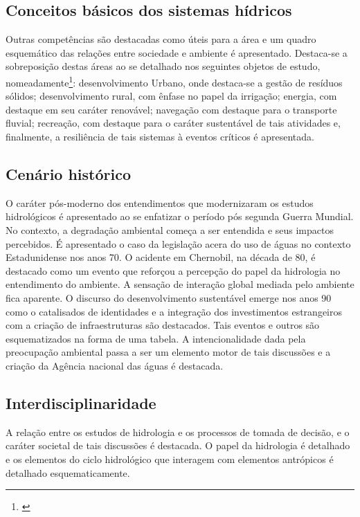 \documentclass[
   article,       %
   12pt,          %
   oneside,       %
   a4paper,       %
   english,       %
   brazil,           %
   sumario=tradicional
   ]{abntex2}
\begin{document}
\subsection{Conceitos básicos dos sistemas hídricos}


Outras competências são destacadas como úteis para a área e um quadro esquemático das relações entre sociedade e ambiente é apresentado. Destaca-se a sobreposição destas áreas ao se detalhado nos seguintes objetos de estudo, nomeadamente\footnote{\cite[p.255-257]{Interdisciplinaridade_Hidricos}}: desenvolvimento Urbano, onde destaca-se a gestão de resíduos sólidos; desenvolvimento rural, com ênfase no papel da irrigação; energia, com destaque em seu caráter renovável; navegação com destaque para o transporte fluvial; recreação, com destaque para o caráter sustentável de tais atividades e, finalmente, a resiliência de tais sistemas à eventos críticos é apresentada.


\subsection{Cenário histórico}

O caráter pós-moderno dos entendimentos que modernizaram os estudos hidrológicos é apresentado ao se enfatizar o período pós segunda Guerra Mundial. No contexto, a degradação ambiental começa a ser entendida e seus impactos percebidos. É apresentado o caso da legislação acera do uso de águas no contexto Estadunidense nos anos 70. O acidente em Chernobil, na década de 80, é destacado como um evento que reforçou a percepção do papel da hidrologia no entendimento do ambiente. A sensação de interação global mediada pelo ambiente fica aparente. O discurso do desenvolvimento sustentável emerge nos anos 90 como o catalisados de identidades e a integração dos investimentos estrangeiros com a criação de infraestruturas são destacados. Tais eventos e outros são esquematizados na forma de uma tabela. A intencionalidade dada pela preocupação ambiental passa a ser um elemento motor de tais discussões e a criação da Agência nacional das águas é destacada.


\subsection{Interdisciplinaridade}

A relação entre os estudos de hidrologia e os processos de tomada de decisão, e o caráter societal de tais discussões é destacada. O papel da hidrologia é detalhado e os elementos do ciclo hidrológico que interagem com elementos antrópicos é detalhado esquematicamente.
\end{document}
